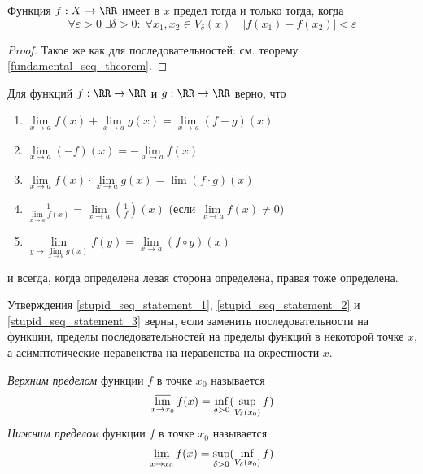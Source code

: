 \documentclass[12pt,a4paper]{article}
\begin{document}
    \begin{statement}
        Функция $f: X \to \RR$ имеет в $x$ предел тогда и только тогда, когда
        \[\forall \varepsilon > 0\; \exists \delta > 0:\; \forall x_1, x_2 \in V_\delta(x)\quad |f(x_1) - f(x_2)| < \varepsilon\]
    \end{statement}

    \begin{proof}
        Такое же как для последовательностей: см. теорему \ref{fundamental_seq_theorem}.
    \end{proof}

    \begin{statement}
        Для функций $f: \RR \to \RR$ и $g: \RR \to \RR$ верно, что
        \begin{enumerate}
            \item $\lim\limits_{x \to a} f(x) + \lim\limits_{x \to a} g(x) = \lim\limits_{x \to a} (f + g)(x)$
            \item $\lim\limits_{x \to a} (-f)(x) = -\lim\limits_{x \to a} f(x)$
            \item $\lim\limits_{x \to a} f(x) \cdot \lim\limits_{x \to a} g(x) = \lim (f \cdot g)(x)$
            \item $\frac{1}{\lim\limits_{x \to a} f(x)} = \lim\limits_{x \to a} (\frac{1}{f})(x)$ (если $\lim\limits_{x \to a} f(x) \neq 0$)
            \item $\lim\limits_{y \to \lim\limits_{x \to a} g(x)} f(y) = \lim\limits_{x \to a} (f \circ g)(x)$
        \end{enumerate}
        и всегда, когда определена левая сторона определена, правая тоже определена.
    \end{statement}

    \begin{remark}
        Утверждения \ref{stupid_seq_statement_1}, \ref{stupid_seq_statement_2} и \ref{stupid_seq_statement_3} верны, если заменить последовательности на функции, пределы последовательностей на пределы функций в некоторой точке $x$, а асимптотические неравенства на неравенства на окрестности $x$.
    \end{remark}

    \begin{definition}
        \emph{Верхним пределом} функции $f$ в точке $x_0$ называется
        \[\varlimsup\limits_{x \to x_0} f(x) = \inf_{\delta > 0} (\sup_{V_\delta(x_0)} f)\]
        \emph{Нижним пределом} функции $f$ в точке $x_0$ называется
        \[\varliminf\limits_{x \to x_0} f(x) = \sup_{\delta > 0} (\inf_{V_\delta(x_0)} f)\]
    \end{definition}
\end{document}

